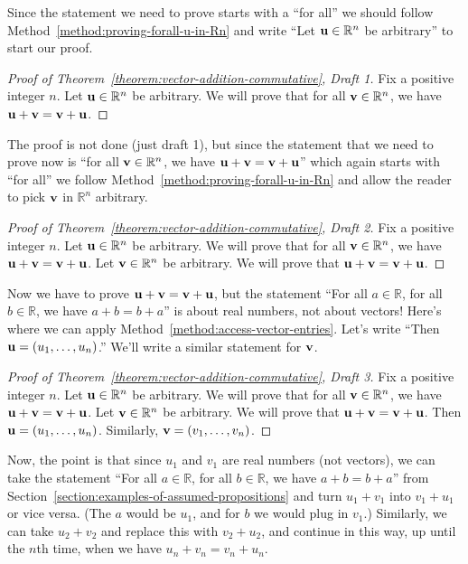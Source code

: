 \documentclass{book}
\theoremstyle{ekimcustom}
\begin{document}
Since the statement we need to prove starts with a ``for all'' we should follow Method~\ref{method:proving-forall-u-in-Rn} and write ``Let ${\bf u} \in \mathbb{R}^n$ be arbitrary'' to start our proof.
\begin{proof}[Proof of Theorem~\ref{theorem:vector-addition-commutative}, Draft 1]
Fix a positive integer $n$. Let ${\bf u} \in \mathbb{R}^n$ be arbitrary. We will prove that for all ${\bf v} \in \mathbb{R}^n$, we have ${\bf u}+{\bf v} = {\bf v} + {\bf u}$.
\end{proof}
The proof is not done (just draft 1), but since the statement that we need to prove now is ``for all ${\bf v} \in \mathbb{R}^n$, we have ${\bf u}+{\bf v} = {\bf v} + {\bf u}$'' which again starts with ``for all'' we follow Method~\ref{method:proving-forall-u-in-Rn} and allow the reader to pick ${\bf v}$ in $\mathbb{R}^n$ arbitrary.
\begin{proof}[Proof of Theorem~\ref{theorem:vector-addition-commutative}, Draft 2]
Fix a positive integer $n$. Let ${\bf u} \in \mathbb{R}^n$ be arbitrary. We will prove that for all ${\bf v} \in \mathbb{R}^n$, we have ${\bf u}+{\bf v} = {\bf v} + {\bf u}$. Let ${\bf v} \in \mathbb{R}^n$ be arbitrary. We will prove that ${\bf u}+{\bf v} = {\bf v} + {\bf u}$.
\end{proof}
Now we have to prove ${\bf u}+{\bf v} = {\bf v} + {\bf u}$, but the statement ``For all $a \in \mathbb{R}$, for all $b \in \mathbb{R}$, we have $a+b=b+a$'' is about real numbers, not about vectors! Here's where we can apply Method~\ref{method:access-vector-entries}. Let's write ``Then ${\bf u} = (u_1,\dots,u_n)$.'' We'll write a similar statement for ${\bf v}$.
\begin{proof}[Proof of Theorem~\ref{theorem:vector-addition-commutative}, Draft 3]
Fix a positive integer $n$. Let ${\bf u} \in \mathbb{R}^n$ be arbitrary. We will prove that for all ${\bf v} \in \mathbb{R}^n$, we have ${\bf u}+{\bf v} = {\bf v} + {\bf u}$. Let ${\bf v} \in \mathbb{R}^n$ be arbitrary. We will prove that ${\bf u}+{\bf v} = {\bf v} + {\bf u}$. Then ${\bf u} = (u_1,\dots,u_n)$. Similarly, ${\bf v} = (v_1,\dots,v_n)$.
\end{proof}
Now, the point is that since $u_1$ and $v_1$ are real numbers (not vectors), we can take the statement ``For all $a \in \mathbb{R}$, for all $b \in \mathbb{R}$, we have $a+b=b+a$'' from Section~\ref{section:examples-of-assumed-propositions} and turn $u_1+v_1$ into $v_1+u_1$ or vice versa. (The $a$ would be $u_1$, and for $b$ we would plug in $v_1$.) Similarly, we can take $u_2+v_2$ and replace this with $v_2+u_2$, and continue in this way, up until the $n$th time, when we have $u_n+v_n=v_n+u_n$.
\end{document}

